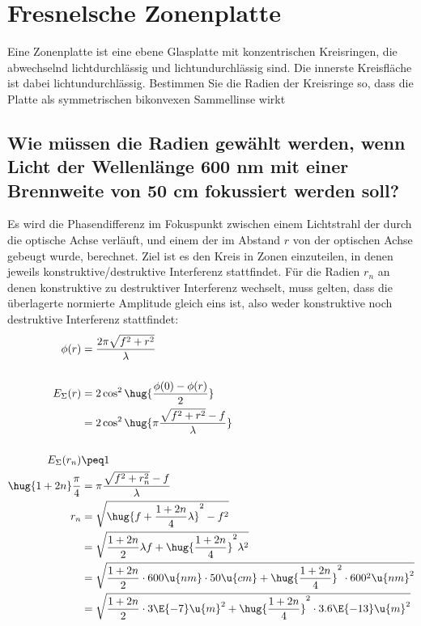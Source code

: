 \documentclass[ex]{exercise}
\begin{document}
\section{Fresnelsche Zonenplatte}
Eine Zonenplatte ist eine ebene Glasplatte mit konzentrischen Kreisringen, die abwechselnd lichtdurchlässig und
lichtundurchlässig sind. Die innerste Kreisfläche ist dabei lichtundurchlässig. 
Bestimmen Sie die Radien der Kreisringe so, dass die Platte als symmetrischen bikonvexen Sammellinse wirkt

\subsection{Wie müssen die Radien gewählt werden, wenn Licht der Wellenlänge 600 nm mit einer Brennweite von 50 cm
fokussiert werden soll?}

\dottedlinett

Es wird die Phasendifferenz im Fokuspunkt zwischen einem Lichtstrahl
der durch die optische Achse verläuft, und einem der im Abstand \(r\) von der 
optischen Achse gebeugt wurde, berechnet. Ziel ist es den Kreis in Zonen einzuteilen, in
denen jeweils konstruktive/destruktive Interferenz stattfindet. Für die 
Radien \(r_n\) an denen konstruktive zu destruktiver Interferenz wechselt, muss gelten, dass 
die überlagerte normierte Amplitude gleich eins ist, also weder konstruktive noch destruktive
Interferenz stattfindet:
\begin{align*}
    \phi(r) &= \frac{2\pi \sqrt{f^2 + r^2}}{\lambda}\\
    \\
    E_\Sigma(r) &= 2\cos^2\hug{\frac{\phi(0)- \phi(r)}{2}}\\
    &= 2\cos^2\hug{\pi\frac{\sqrt{f^2 + r^2} - f}{\lambda}}\\
    \\
    E_\Sigma(r_n) &\peq 1\\
    \hug{1+2n}\frac\pi4 &= \pi\frac{\sqrt{f^2 + r_n^2} - f}{\lambda}\\
    r_n &= \sqrt{\hug{f + \frac{1+2n}4 \lambda}^2 - f^2}\\
    &= \sqrt{\frac{1+2n}2 \lambda f + \hug{\frac{1+2n}4}^2 \lambda^2}\\
    &= \sqrt{\frac{1+2n}2 \cdot600\u{nm} \cdot 50\u{cm} + \hug{\frac{1+2n}4}^2 \cdot600^2\u{nm}^2}\\
    &= \sqrt{\frac{1+2n}2 \cdot3\E{-7}\u{m}^2 + \hug{\frac{1+2n}4}^2 \cdot3.6\E{-13}\u{m}^2}
\end{align*}
\end{document}
